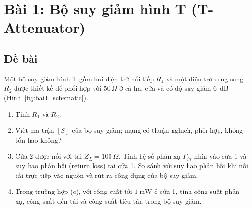 \documentclass[12pt,a4paper]{article}
\begin{document}
\newpage

\section{Bài 1: Bộ suy giảm hình T (T-Attenuator)}

\subsection{Đề bài}
Một bộ suy giảm hình T gồm hai điện trở nối tiếp $R_1$ và một điện trở song song $R_2$ được thiết kế để phối hợp với $50~\Omega$ ở cả hai cửa và có độ suy giảm 6~dB (Hình~\ref{fig:bai1_schematic}).
\begin{enumerate}
    \item[(a)] Tính $R_1$ và $R_2$.
    \item[(b)] Viết ma trận $[S]$ của bộ suy giảm; mạng có thuận nghịch, phối hợp, không tổn hao không?
    \item[(c)] Cửa 2 được nối với tải $Z_L = 100~\Omega$. Tính hệ số phản xạ $\Gamma_{in}$ nhìn vào cửa 1 và suy hao phản hồi (return loss) tại cửa 1. So sánh với suy hao phản hồi khi nối tải trực tiếp vào nguồn và rút ra công dụng của bộ suy giảm.
    \item[(d)] Trong trường hợp (c), với công suất tới $1~\text{mW}$ ở cửa 1, tính công suất phản xạ, công suất đến tải và công suất tiêu tán trong bộ suy giảm.
\end{enumerate}
\end{document}
